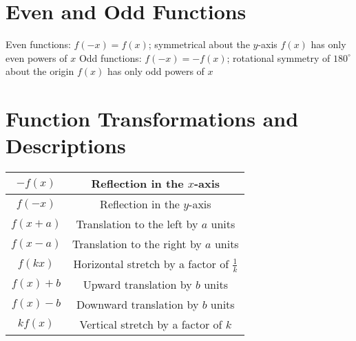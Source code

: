 \documentclass[11pt]{article}
\newcommand{\degsym}{^{\circ}}
\begin{document}
\pagebreak

\section{Even and Odd Functions}

\begin{outline}[enumerate]
  \1 Even functions: $f(-x) = f(x)$; symmetrical about the $y$-axis
  \2 $f(x)$ has only even powers of $x$
  \1 Odd functions: $f(-x) = -f(x)$; rotational symmetry of $180\degsym$ about the origin
  \2 $f(x)$ has only odd powers of $x$
\end{outline}

\section{Function Transformations and Descriptions}

\begin{center}
  \bgroup
  \def\arraystretch{1.5}
  \begin{tabular}{|c|c|}
    \hline
    $-f(x)$    & Reflection in the $x$-axis                      \\ \hline
    $f(-x)$    & Reflection in the $y$-axis                      \\ \hline
    $f(x + a)$ & Translation to the left by $a$ units            \\ \hline
    $f(x - a)$ & Translation to the right by $a$ units           \\ \hline
    $f(kx)$    & Horizontal stretch by a factor of $\frac{1}{k}$ \\ \hline
    $f(x) + b$ & Upward translation by $b$ units                 \\ \hline
    $f(x) - b$ & Downward translation by $b$ units               \\ \hline
    $kf(x)$    & Vertical stretch by a factor of $k$             \\ \hline
  \end{tabular}
  \egroup
\end{center}
\end{document}

